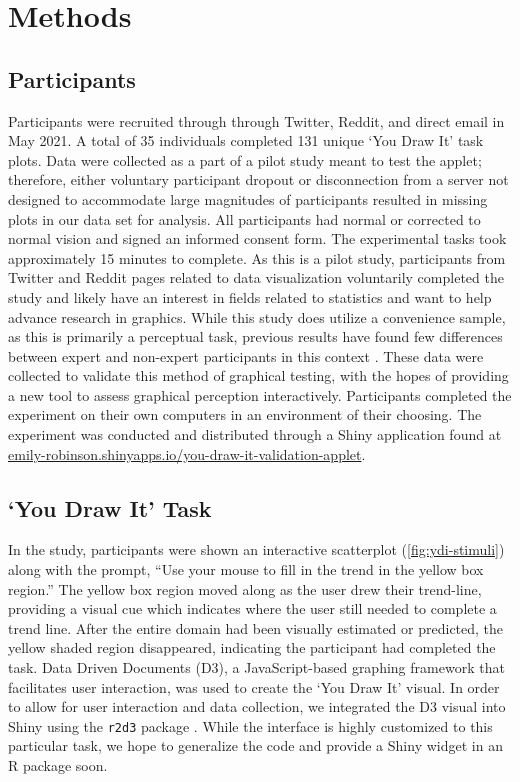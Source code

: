 \documentclass[12pt]{article}
\begin{document}
\hypertarget{methods}{%
\section{Methods}\label{methods}}

\hypertarget{participants}{%
\subsection{Participants}\label{participants}}

Participants were recruited through through Twitter, Reddit, and direct
email in May 2021. A total of 35 individuals completed 131 unique `You
Draw It' task plots. Data were collected as a part of a pilot study
meant to test the applet; therefore, either voluntary participant
dropout or disconnection from a server not designed to accommodate large
magnitudes of participants resulted in missing plots in our data set for
analysis. All participants had normal or corrected to normal vision and
signed an informed consent form. The experimental tasks took
approximately 15 minutes to complete. As this is a pilot study,
participants from Twitter and Reddit pages related to data visualization
voluntarily completed the study and likely have an interest in fields
related to statistics and want to help advance research in graphics.
While this study does utilize a convenience sample, as this is primarily
a perceptual task, previous results have found few differences between
expert and non-expert participants in this context
\citep{vanderplas2015spatial}. These data were collected to validate
this method of graphical testing, with the hopes of providing a new tool
to assess graphical perception interactively. Participants completed the
experiment on their own computers in an environment of their choosing.
The experiment was conducted and distributed through a Shiny application
\citep{shinyPkg} found at
\href{https://emily-robinson.shinyapps.io/you-draw-it-validation-applet/}{emily-robinson.shinyapps.io/you-draw-it-validation-applet}.

\hypertarget{you-draw-it-task}{%
\subsection{`You Draw It' Task}\label{you-draw-it-task}}

In the study, participants were shown an interactive scatterplot
(\cref{fig:ydi-stimuli}) along with the prompt, ``Use your mouse to fill
in the trend in the yellow box region.'' The yellow box region moved
along as the user drew their trend-line, providing a visual cue which
indicates where the user still needed to complete a trend line. After
the entire domain had been visually estimated or predicted, the yellow
shaded region disappeared, indicating the participant had completed the
task. Data Driven Documents (D3), a JavaScript-based graphing framework
that facilitates user interaction, was used to create the `You Draw It'
visual. In order to allow for user interaction and data collection, we
integrated the D3 visual into Shiny using the \texttt{r2d3} package
\citep{r2d3}. While the interface is highly customized to this
particular task, we hope to generalize the code and provide a Shiny
widget in an R package soon.
\end{document}
